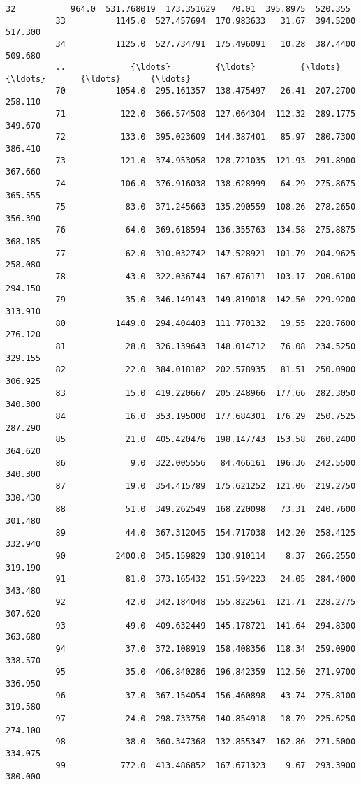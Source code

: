 \documentclass[11pt]{article}
\begin{document}
\begin{Verbatim}[commandchars=\\\{\}]
          32           964.0  531.768019  173.351629   70.01  395.8975  520.355   
          33          1145.0  527.457694  170.983633   31.67  394.5200  517.300   
          34          1125.0  527.734791  175.496091   10.28  387.4400  509.680   
          ..             {\ldots}         {\ldots}         {\ldots}     {\ldots}       {\ldots}      {\ldots}   
          70          1054.0  295.161357  138.475497   26.41  207.2700  258.110   
          71           122.0  366.574508  127.064304  112.32  289.1775  349.670   
          72           133.0  395.023609  144.387401   85.97  280.7300  386.410   
          73           121.0  374.953058  128.721035  121.93  291.8900  367.660   
          74           106.0  376.916038  138.628999   64.29  275.8675  365.555   
          75            83.0  371.245663  135.290559  108.26  278.2650  356.390   
          76            64.0  369.618594  136.355763  134.58  275.8875  368.185   
          77            62.0  310.032742  147.528921  101.79  204.9625  258.080   
          78            43.0  322.036744  167.076171  103.17  200.6100  294.150   
          79            35.0  346.149143  149.819018  142.50  229.9200  313.910   
          80          1449.0  294.404403  111.770132   19.55  228.7600  276.120   
          81            28.0  326.139643  148.014712   76.08  234.5250  329.155   
          82            22.0  384.018182  202.578935   81.51  250.0900  306.925   
          83            15.0  419.220667  205.248966  177.66  282.3050  340.300   
          84            16.0  353.195000  177.684301  176.29  250.7525  287.290   
          85            21.0  405.420476  198.147743  153.58  260.2400  364.620   
          86             9.0  322.005556   84.466161  196.36  242.5500  340.300   
          87            19.0  354.415789  175.621252  121.06  219.2750  330.430   
          88            51.0  349.262549  168.220098   73.31  240.7600  301.480   
          89            44.0  367.312045  154.717038  142.20  258.4125  332.940   
          90          2400.0  345.159829  130.910114    8.37  266.2550  319.190   
          91            81.0  373.165432  151.594223   24.05  284.4000  343.480   
          92            42.0  342.184048  155.822561  121.71  228.2775  307.620   
          93            49.0  409.632449  145.178721  141.64  294.8300  363.680   
          94            37.0  372.108919  158.408356  118.34  259.0900  338.570   
          95            35.0  406.840286  196.842359  112.50  271.9700  336.950   
          96            37.0  367.154054  156.460898   43.74  275.8100  319.580   
          97            24.0  298.733750  140.854918   18.79  225.6250  274.100   
          98            38.0  360.347368  132.855347  162.86  271.5000  334.075   
          99           772.0  413.486852  167.671323    9.67  293.3900  380.000   
          

\end{Verbatim}
\end{document}
